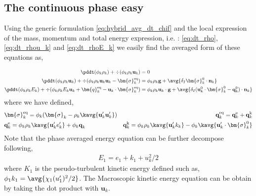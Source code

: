 \subsection{The continuous phase easy}

Using the generic formulation \ref{eq:hybrid_avg_dt_chif} and the local expression of the mass, momentum and total energy expression, i.e. : \ref{eq:dt_rho},\ref{eq:dt_rhou_k} and \ref{eq:dt_rhoE_k} we easily find the averaged form of these equations as, 

\begin{align}
    \label{eq:dt_&vg_rho}
    \pddt (\phi_k \rho_k)  
    + \div (
        \phi_k \rho_k\textbf{u}_k
    )
    &= 
    0\\
    \label{eq:dt_&vg_rhou_k}
    \pddt (\phi_k \rho_k\textbf{u}_k)  
    + \div (
        \phi_k \rho_k\textbf{u}_k\textbf{u}_k
        - \bm{\sigma}_k^\text{eq}
    )
    &= 
    \phi_k \rho_k \textbf{g} 
    +  \avg{\delta_I \bm{\sigma}_k^0 \cdot \textbf{n}_k}\\
    \label{eq:dt_&vg_rhoE_k}
    \pddt (\phi_k\rho_kE_k)  
    + \div (
        \phi_k\rho_kE_k\textbf{u}_k
        + \bm{q}_k^\text{eq}
        - \textbf{u}_k \cdot \bm{\sigma}_k^\text{eq}
        )
    &= 
    \phi_k \rho_k\textbf{u}_k \cdot \textbf{g} 
    + \avg{\delta_I (\textbf{u}_k^0 \cdot \bm{\sigma}_k^0 - \textbf{q}_k^0)\cdot \textbf{n}_k}
\end{align} 
where we have defined, 
\begin{align*}
    &\bm{\sigma}_k^\text{eq}
    = \phi_k (
        \bm{\sigma}_k%
        - \rho_k \kavg{\textbf{u}_k'\textbf{u}_k'})  
    &\textbf{q}_k^\text{eq}
    =\textbf{q}_k^\text{e} +\textbf{q}_k^\text{k}  \\
    &\textbf{q}_k^\text{e}
    = \phi_k\rho_k \kavg{\textbf{u}_k' e_k'} 
    + \phi_k\textbf{q}_k 
    &\textbf{q}_k^\text{k}
    = \phi_k\rho_k \kavg{\textbf{u}_k' k_k} 
    - \phi_k\kavg{\textbf{u}_k' \cdot \bm{\sigma}_k^0}
\end{align*}
Note that the phase averaged energy equation can be further decompose following, 
\begin{align*}
    E_1 = e_1 + k_1 + u_k^2/2
\end{align*}
where $K_1$ is the pseudo-turbulent kinetic energy defined such as, $\phi_1 k_1 = \avg{\chi_1 (u_1')^2/2}$. 
The Macroscopic kinetic energy equation can be obtain by taking the dot product with $\textbf{u}_k$. 
